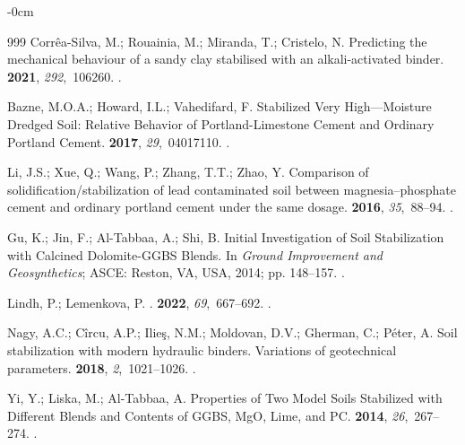 \documentclass[sustainability,article,accept,pdftex,moreauthors]{Definitions/mdpi}
\begin{document}
{{\begin{adjustwidth}{-\extralength}{0cm}
\begin{thebibliography}{999}
Corrêa-Silva, M.; Rouainia, M.; Miranda, T.; Cristelo, N.
\newblock Predicting the mechanical behaviour of a sandy clay stabilised with
  an alkali-activated binder.
 {\bf 2021}, {\em 292},~106260.
.

Bazne, M.O.A.; Howard, I.L.; Vahedifard, F.
\newblock Stabilized Very High---Moisture Dredged Soil: Relative Behavior of
  Portland-Limestone Cement and Ordinary Portland Cement.
 {\bf 2017}, {\em
  29},~04017110.
.

Li, J.S.; Xue, Q.; Wang, P.; Zhang, T.T.; Zhao, Y.
\newblock Comparison of solidification/stabilization of lead contaminated soil
  between magnesia–phosphate cement and ordinary portland cement under the
  same dosage.
 {\bf 2016}, {\em
  35},~88--94.
.

Gu, K.; Jin, F.; Al-Tabbaa, A.; Shi, B. Initial Investigation of Soil
  Stabilization with Calcined Dolomite-GGBS Blends.
\newblock In {\em Ground Improvement and Geosynthetics}; ASCE: Reston, VA, USA, 2014; pp.
  148--157.
.

Lindh, P.; Lemenkova, P.
.
 {\bf 2022}, {\em
  69},~667--692.
.

Nagy, A.C.; Cîrcu, A.P.; Ilieş, N.M.; Moldovan, D.V.; Gherman, C.; Péter, A.
\newblock Soil stabilization with modern hydraulic binders. Variations of
  geotechnical parameters.
 {\bf 2018}, {\em 2},~1021--1026.
.

Yi, Y.; Liska, M.; Al-Tabbaa, A.
\newblock Properties of Two Model Soils Stabilized with Different Blends and
  Contents of GGBS, MgO, Lime, and PC.
 {\bf 2014}, {\em
  26},~267--274.
.


\end{thebibliography}
\end{adjustwidth}}}
\end{document}
